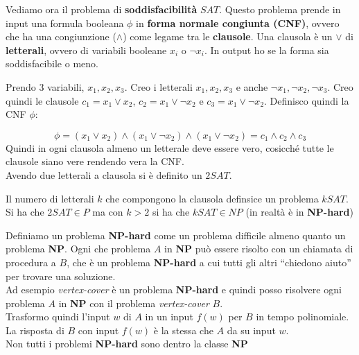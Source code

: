 \documentclass[a4paper,12pt, oneside]{book}
\begin{document}
\begin{definizione}
  Vediamo ora il problema di \textbf{soddisfacibilità} $SAT$. Questo problema
  prende in input una formula booleana $\phi$ in \textbf{forma normale congiunta
    (CNF)}, ovvero che ha una congiunzione ($\land$) come legame tra le
  \textbf{clausole}. Una clausola è un $\lor$ di \textbf{letterali}, ovvero di
  variabili booleane $x_i$ o $\neg x_i$. In output ho se la forma sia
  soddisfacibile o meno. 
  \begin{esempio}
    Prendo 3 variabili, $x_1,x_2,x_3$. Creo i letterali  $x_1,x_2,x_3$ e anche
    $\neg x_1,\neg x_2,\neg x_3$. Creo quindi le clausole $c_1=x_1\lor x_2$,
    $c_2=x_1\lor \neg x_2$ e $c_3=x_1\lor \neg x_2$. Definisco quindi la CNF
    $\phi$:
    
    \[\phi=(x_1\lor x_2)\land (x_1\lor \neg x_2)\land
      (x_1\lor \neg x_2)=c_1\land c_2\land c_3\]
    Quindi in ogni clausola almeno un letterale deve essere vero, cosicché tutte
    le clausole siano vere rendendo vera la CNF.\\
    Avendo due letterali a clausola si è definito un $2SAT$.
  \end{esempio}
  Il numero di letterali $k$ che compongono la clausola definsice un problema
  $kSAT$. Si ha che $2SAT\in P$ ma con $k>2$ si ha che $kSAT\in NP$ (in
  realtà è in \textbf{NP-hard})
\end{definizione}
\begin{definizione}
  Definiamo un problema \textbf{NP-hard} come un problema difficile almeno
  quanto un problema \textbf{NP}. Ogni che problema $A$ in \textbf{NP} può
  essere risolto con un chiamata di procedura a $B$, che è un problema
  \textbf{NP-hard} a cui tutti gli altri ``chiedono aiuto'' per trovare una
  soluzione. \\
  Ad esempio \textit{vertex-cover} è un problema \textbf{NP-hard} e quindi posso
  risolvere ogni problema $A$ in \textbf{NP} con il problema
  \textit{vertex-cover} $B$.\\
  Trasformo quindi l'input $w$ di $A$ in un input
  $f(w)$ per $B$ in tempo polinomiale. La risposta di $B$ con input $f(w)$ è la
  stessa che $A$ da su input $w$.\\
  Non tutti i problemi \textbf{NP-hard} sono dentro la classe \textbf{NP}
\end{definizione}
\end{document}
